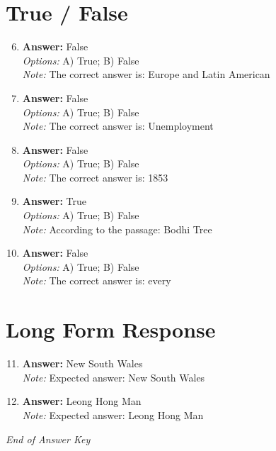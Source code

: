 \documentclass[12pt]{article}
\begin{document}
\section*{True / False}
\begin{enumerate}[label=\arabic*.]
\setcounter{enumi}{5}
\item \textbf{Answer:} False
\\ \textit{Options:} A) True; B) False
\\ \textit{Note:} The correct answer is: Europe and Latin American
\item \textbf{Answer:} False
\\ \textit{Options:} A) True; B) False
\\ \textit{Note:} The correct answer is: Unemployment
\item \textbf{Answer:} False
\\ \textit{Options:} A) True; B) False
\\ \textit{Note:} The correct answer is: 1853
\item \textbf{Answer:} True
\\ \textit{Options:} A) True; B) False
\\ \textit{Note:} According to the passage: Bodhi Tree
\item \textbf{Answer:} False
\\ \textit{Options:} A) True; B) False
\\ \textit{Note:} The correct answer is: every
\end{enumerate}

\section*{Long Form Response}
\begin{enumerate}[label=\arabic*.]
\setcounter{enumi}{10}
\item \textbf{Answer:} New South Wales
\\ \textit{Note:} Expected answer: New South Wales
\item \textbf{Answer:} Leong Hong Man
\\ \textit{Note:} Expected answer: Leong Hong Man
\end{enumerate}

\vfill
\noindent\textit{End of Answer Key}
\end{document}
